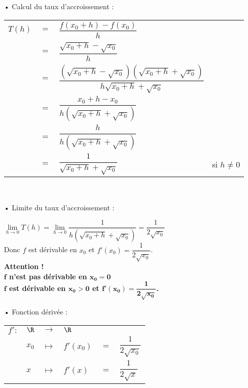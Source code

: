 \begin{itemize}
\item[•] Calcul du taux d'accroissement : \vspace*{.3cm}
\\
\begin{tabular}{llll}
$T(h)$ & $=$ & $\dfrac{f(x_0 + h) - f(x_0)}{h}$ & \vspace*{.3cm} \\
& $=$ & $\dfrac{\sqrt{x_0 + h} - \sqrt{x_0}}{h}$ & \vspace*{.3cm} \\
& $=$ & $\dfrac{\left(\sqrt{x_0 + h} - \sqrt{x_0}\right)\left(\sqrt{x_0 + h} + \sqrt{x_0}\right)}{h\sqrt{x_0 + h} + \sqrt{x_0}}$ & \vspace*{.3cm} \\
& $=$ & $\dfrac{x_0 + h - x_0}{h\left(\sqrt{x_0 + h} + \sqrt{x_0}\right)}$ & \vspace*{.3cm} \\
& $=$ & $\dfrac{h}{h\left(\sqrt{x_0 + h} + \sqrt{x_0}\right)}$ & \vspace*{.3cm} \\
& $=$ & $ \dfrac{1}{\sqrt{x_0 + h} + \sqrt{x_0}}$ & si $h \neq 0$ \vspace*{.3cm} \\
\end{tabular} \\
\vspace*{.3cm}

\item[•] Limite du taux d'accroissement : \vspace*{.3cm}

$\lim\limits_{h \to 0} T(h) = \lim\limits_{h \to 0} \dfrac{1}{h\left(\sqrt{x_0 + h} + \sqrt{x_0}\right)} = \dfrac{1}{2\sqrt{x_0}}$ \vspace*{.3cm} \\

Donc $f$ est dérivable en $x_0$ et $f'(x_0) = \dfrac{1}{2\sqrt{x_0}}$. \\

\textbf{Attention !} \\

\textbf{$\mathbf{f}$ n'est pas dérivable en $\mathbf{x_0 = 0}$} \\

\textbf{$\mathbf{f}$ est dérivable en $\mathbf{x_0 > 0}$ et $\mathbf{f'(x_0) = \dfrac{1}{2\sqrt{x_0}}}$.} \\

\item[•] Fonction dérivée : \\

\begin{tabular}{llllll}
$f' :$ & $\R$ & $\longrightarrow$ & $\R$ & & \\
& $x_0$ & $\longmapsto$ & $f'(x_0)$ & $ = $ & $\dfrac{1}{2\sqrt{x_0}}$ \vspace*{.3cm} \\
& $x$ & $\longmapsto$ & $f'(x)$ & $ = $ & $\dfrac{1}{2\sqrt{x}}$ \\
\end{tabular}
\end{itemize}

